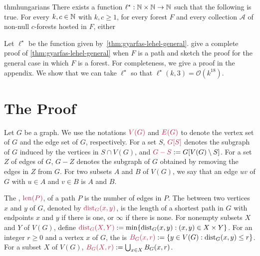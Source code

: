 \documentclass{patmorin}
\DeclareMathOperator{\len}{len}
\DeclareMathOperator{\dist}{dist}
\newcommand{\Oh}{\mathcal{O}}
\begin{document}
\begin{restatable}{thm}{hungarians}\label{thm:gyarfas-lehel-general}
   There exists a function $\ell^\star:\mathbb{N}\times\mathbb{N}\to\mathbb{N}$ such that the following is true. For every $k,c\in\mathbb{N}$ with $k,c\geq1$, for every forest $F$ and every collection $\mathcal{A}$ of non-null $c$-forests hosted in $F$, either
\end{restatable}
Let $\ell^\star$ be the function given by~\cref{thm:gyarfas-lehel-general}. \citet{gyarfas.lehel:helly} give a complete proof of \cref{thm:gyarfas-lehel-general} when $F$ is a path and sketch the proof for the general case in which $F$ is a forest. For completeness, we give a proof in the appendix. We show that we can take $\ell^\star$ so that $\ell^\star(k,3)=\Oh(k^{18})$.

\section{The Proof}
\label{proof}

Let $G$ be a graph.  We use the notations $\mathdefin{V(G)}$ and $\mathdefin{E(G)}$ to denote the vertex set of $G$ and the edge set of $G$, respectively.  For a set $S$, $\mathdefin{G[S]}$ denotes the subgraph of $G$ induced by the vertices in $S\cap V(G)$, and $\mathdefin{G-S}:=G[V(G)\setminus S]$.  For a set $Z$ of edges of $G$, $G-Z$ denotes the subgraph of $G$ obtained by removing the edges in $Z$ from $G$.  For two subsets $A$ and $B$ of $V(G)$, we say that an edge $uv$ of $G$ with $u\in A$ and $v\in B$ is  $A$ and $B$.



The , $\mathdefin{\len(P)}$, of a path $P$ is the number of edges in $P$. The  between two vertices $x$ and $y$ of $G$, denoted by $\mathdefin{\dist_G(x,y)}$, is the length of a shortest path in $G$ with endpoints $x$ and $y$ if there is one, or $\infty$ if there is none. For nonempty subsets $X$ and $Y$ of $V(G)$, define $\mathdefin{\dist_G(X,Y)}:=\min\{\dist_G(x,y):(x,y)\in X\times Y\}$. For an integer $r\ge 0$ and a vertex $x$ of $G$, the  is $\mathdefin{B_G(x,r)}:=\{y\in V(G):\dist_G(x,y)\le r\}$.  For a subset $X$ of $V(G)$, $\mathdefin{B_G(X,r)}:=\bigcup_{x\in X}B_G(x,r)$.
\end{document}
